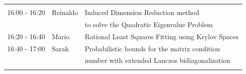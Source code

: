 \documentclass{beamer}
\begin{document}
\begin{frame}
\begin{table}[h]
\begin{tabular}{lll}
\hline \\ [-1.5ex]
16:00 - 16:20 & Reinaldo & Induced Dimension Reduction method \\
            & & to solve the Quadratic Eigenvalue Problem \\ [0.5ex]
16:20 - 16:40 & Mario & Rational Least Squares Fitting using Krylov Spaces\\ [0.5ex]
16:40 - 17:00 & Sarah & Probabilistic bounds for the matrix condition  \\
                    & & number with extended Lanczos bidiagonalization\\ [0.5ex]
\hline \\ [-1.5ex]
\end{tabular}
\end{table}
\end{frame}
\end{document}
